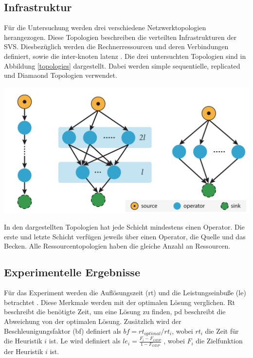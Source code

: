 \documentclass{article}
\begin{document}
\subsection{Infrastruktur}
Für die Untersuchung werden drei verschiedene Netzwerktopologien herangezogen. 
Diese Topologien beschreiben die verteilten Infrastrukturen der SVS. 
Diesbezüglich werden die Rechnerressourcen und deren Verbindungen definiert, sowie die inter-knoten latenz \cite{efficient-operator-placement}.
Die drei untersuchten Topologien sind in Abbildung \ref{topologies} dargestellt. Dabei werden simple sequentielle, replicated und Diamaond Topologien verwendet.\\

\noindent
\begin{minipage}{0.45\textwidth}
    \includegraphics[width=0.75\linewidth]{topologies.png}
\label{topologies}
\end{minipage}
\hspace{10pt}
\begin{minipage}{0.5\textwidth}
    In den dargestellten Topologien hat jede Schicht mindestens einen Operator. 
    Die erste und letzte Schicht verfügen jeweils über einen Operator, die Quelle und das Becken. 
    Alle Ressourcentopologien haben die gleiche Anzahl an Ressourcen.
\end{minipage}



\subsection{Experimentelle Ergebnisse}

Für das Experiment werden die Auflösungszeit (rt) und die Leistungseinbuße (le) betrachtet \cite{efficient-operator-placement}.
Diese Merkmale werden mit der optimalen Lösung verglichen. Rt beschreibt die benötigte Zeit, 
um eine Lösung zu finden, pd beschreibt die Abweichung von der optimalen Lösung. 
Zusätzlich wird der Beschleunigungsfaktor (bf) definiert als $bf = rt_{optimal} / rt_i$, wobei $rt_i$ die Zeit für die Heuristik $i$ ist.
Le wird definiert als $le_i = \frac{F_i - F_{ODP}}{1 - F_{ODP}}$ \cite{efficient-operator-placement}, 
wobei $F_i$ die Zielfunktion der Heuristik $i$ ist.
\end{document}
